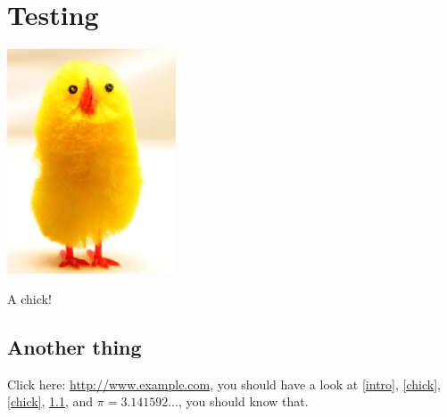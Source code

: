 \chapter{Testing}

\begin{table}[tbhp]\centering
\includegraphics{chick}
\caption{A chick!}\label{chick}
\end{table}

\newcommand\explain[1]{\texttt{\meaning#1}}


\section{Another thing}\label{thing}

Click here: \url{http://www.example.com}, you should have a look at \cref{intro}, \cref{chick}, \autoref{chick}, \cref{thing}, and $\pi = 3.141592\dots$, you should know that.


\explain\captionsspanish

\explain\extrasspanish

\makeatletter
\explain\HyLang@spanish
\makeatother
